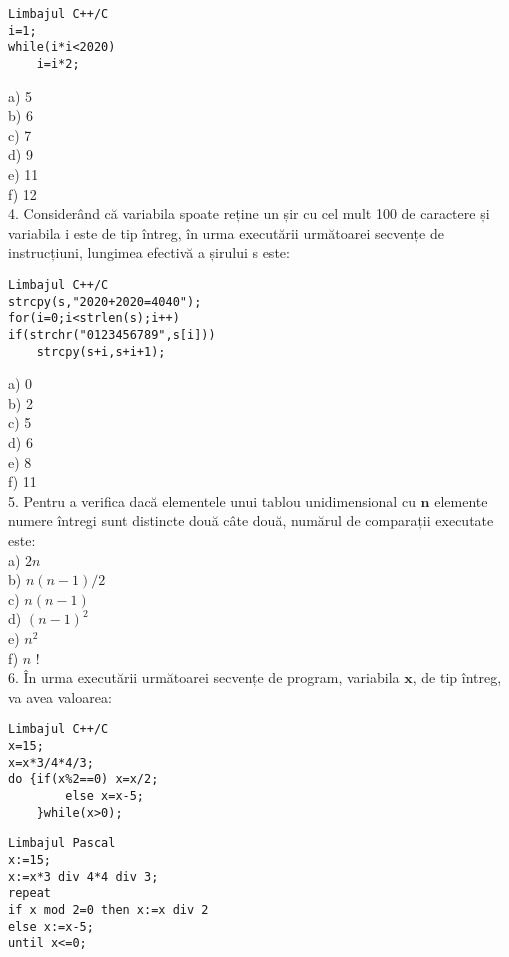 \begin{verbatim}
Limbajul C++/C
i=1;
while(i*i<2020)
    i=i*2;
\end{verbatim}

a) 5\\
b) 6\\
c) 7\\
d) 9\\
e) 11\\
f) 12\\
4. Considerând că variabila spoate reține un șir cu cel mult 100 de caractere și variabila i este de tip întreg, în urma executării următoarei secvențe de instrucțiuni, lungimea efectivă a șirului s este:

\begin{verbatim}
Limbajul C++/C
strcpy(s,"2020+2020=4040");
for(i=0;i<strlen(s);i++)
if(strchr("0123456789",s[i]))
    strcpy(s+i,s+i+1);
\end{verbatim}

a) 0\\
b) 2\\
c) 5\\
d) 6\\
e) 8\\
f) 11\\
5. Pentru a verifica dacă elementele unui tablou unidimensional cu $\mathbf{n}$ elemente numere întregi sunt distincte două câte două, numărul de comparații executate este:\\
a) $2 n$\\
b) $n(n-1) / 2$\\
c) $n(n-1)$\\
d) $(n-1)^{2}$\\
e) $n^{2}$\\
f) $n$ !\\
6. În urma executării următoarei secvențe de program, variabila $\mathbf{x}$, de tip întreg, va avea valoarea:

\begin{verbatim}
Limbajul C++/C
x=15;
x=x*3/4*4/3;
do {if(x%2==0) x=x/2;
        else x=x-5;
    }while(x>0);
\end{verbatim}

\begin{verbatim}
Limbajul Pascal
x:=15;
x:=x*3 div 4*4 div 3;
repeat
if x mod 2=0 then x:=x div 2
else x:=x-5;
until x<=0;
\end{verbatim}

